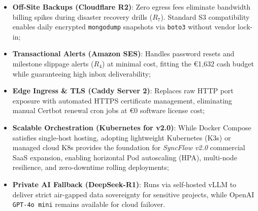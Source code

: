 \begin{itemize}[itemsep=1pt,topsep=1pt]
    \item \textbf{Off-Site Backups (Cloudflare R2)}: Zero egress fees eliminate bandwidth billing spikes during disaster recovery drills ($R_7$). Standard S3 compatibility enables daily encrypted \texttt{mongodump} snapshots via \texttt{boto3} without vendor lock-in;
    \item \textbf{Transactional Alerts (Amazon SES)}: Handles password resets and milestone slippage alerts ($R_4$) at minimal cost, fitting the €1,632 cash budget while guaranteeing high inbox deliverability;
    \item \textbf{Edge Ingress \& TLS (Caddy Server 2)}: Replaces raw HTTP port exposure with automated HTTPS certificate management, eliminating manual Certbot renewal cron jobs at €0 software license cost;
    \item \textbf{Scalable Orchestration (Kubernetes for v2.0)}: While Docker Compose satisfies single-host hosting, adopting lightweight Kubernetes (K3s) or managed cloud K8s provides the foundation for \textit{SyncFlow v2.0} commercial SaaS expansion, enabling horizontal Pod autoscaling (HPA), multi-node resilience, and zero-downtime rolling deployments;
    \item \textbf{Private AI Fallback (DeepSeek-R1)}: Runs via self-hosted vLLM to deliver strict air-gapped data sovereignty for sensitive projects, while OpenAI \texttt{GPT-4o mini} remains available for cloud failover.
\end{itemize}
